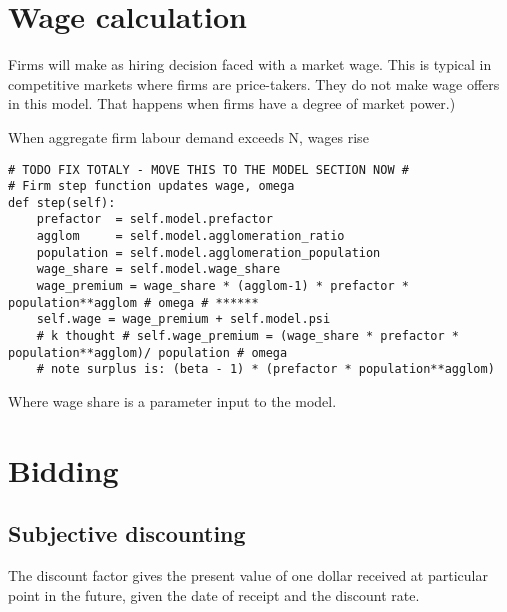 \section{Wage calculation}
Firms will make as hiring decision faced with a market wage. This is typical in \glspl{competitive market} where firms are price-takers. They do not make  wage offers in this model. That happens when firms have a degree of market power.)


When aggregate firm labour demand exceeds N, wages rise 
\begin{lstlisting}
# TODO FIX TOTALY - MOVE THIS TO THE MODEL SECTION NOW #
# Firm step function updates wage, omega
def step(self):
    prefactor  = self.model.prefactor
    agglom     = self.model.agglomeration_ratio
    population = self.model.agglomeration_population
    wage_share = self.model.wage_share  
    wage_premium = wage_share * (agglom-1) * prefactor * population**agglom # omega # ****** 
    self.wage = wage_premium + self.model.psi
    # k thought # self.wage_premium = (wage_share * prefactor * population**agglom)/ population # omega    
    # note surplus is: (beta - 1) * (prefactor * population**agglom)
\end{lstlisting}

Where wage share is a parameter input to the model.

\section{Bidding}
\subsection{Subjective discounting}

The discount factor gives the present value of one dollar received at particular point in the future, given the date of receipt and the discount rate.

